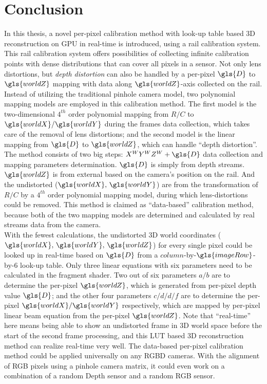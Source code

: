 \section{Conclusion}
\indent
In this thesis, a novel per-pixel calibration method with look-up table based \gls{3D} reconstruction on \gls{GPU} in real-time is introduced, using a rail calibration system. This rail calibration system offers possibilities of collecting infinite calibration points with dense distributions that can cover all pixels in a sensor. Not only lens distortions, but \emph{depth distortion} can also be handled by a per-pixel \(\gls{D}\) to \(\gls{worldZ}\) mapping with data along \(\gls{worldZ}\)-axis collected on the rail. Instead of utilizing the traditional pinhole camera model, two polynomial mapping models are employed in this calibration method. The first model is the two-dimensional \(4^{th}\) order polynomial mapping from \(R/C\) to \(\gls{worldX}/\gls{worldY}\) during the frames data collection, which takes care of the removal of lens distortions; and the second model is the linear mapping from \(\gls{D}\) to \(\gls{worldZ}\), which can handle \enquote{depth distortion}. The method consists of two big steps: \(X^WY^WZ^W+\gls{D}\) data collection and mapping parameters determination. \(\gls{D}\) is simply from depth streams. \(\gls{worldZ}\) is from external based on the camera's position on the rail. And the undistorted (\(\gls{worldX}, \, \gls{worldY}\)) are from the transformation of \(R/C\) by a \(4^{th}\) order polynomial mapping model, during which lens-distortions could be removed. This method is claimed as \enquote{data-based} calibration method, because both of the two mapping models are determined and calculated by real streams data from the camera. 
\\\indent
With the fewest calculations, the undistorted \gls{3D} world coordinates (\(\gls{worldX}, \, \gls{worldY}, \, \gls{worldZ}\)) for every single pixel could be looked up in real-time based on \(\gls{D}\) from a \(column\)-by-\(\gls{imageRow}\)-by-\(6\) look-up table. Only three linear equations with six parameters need to be calculated in the fragment shader. Two out of six parameters \(a/b\) are to determine the per-pixel \(\gls{worldZ}\), which is generated from per-pixel depth value \(\gls{D}\); and the other four parameters \(c/d/d/f\) are to determine the per-pixel \(\gls{worldX}/\gls{worldY}\) respectively, which are mapped by per-pixel linear beam equation from the per-pixel \(\gls{worldZ}\). Note that \enquote{real-time} here means being able to show an undistorted frame in \gls{3D} world space before the start of the second frame processing, and this \gls{LUT} based \gls{3D} reconstruction method can realize real-time very well. The data-based per-pixel calibration method could be applied universally on any \gls{RGBD} cameras. With the alignment of RGB pixels using a pinhole camera matrix, it could even work on a combination of a random Depth sensor and a random RGB sensor.
